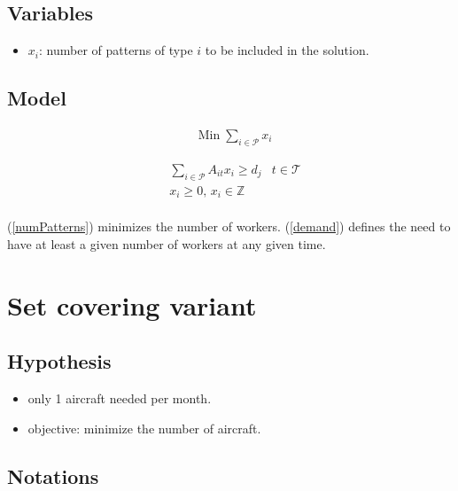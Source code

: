 \documentclass[a4paper,11pt]{article}
\begin{document}
    \subsection{Variables}

    \begin{itemize}
     \item $x_i$: number of patterns of type $i$ to be included in the solution.
    \end{itemize}

    \subsection{Model}

    \begin{align}
        & \text{Min}\; \sum_{i \in \mathcal{P}} x_i \label{numPatterns}
    \end{align}

    \begin{align}
        & \sum_{i \in \mathcal{P}} A_{it}x_{i} \geq d_j & t \in \mathcal{T} \label{demand} \\
        & x_{i} \geq 0,\, x_{i} \in \mathbb{Z} \\
    \end{align}

    (\ref{numPatterns}) minimizes the number of workers. (\ref{demand}) defines the need to have at least a given number of workers at any given time.  

\clearpage

\section{Set covering variant}

    \subsection{Hypothesis}

    \begin{itemize}
     \item only 1 aircraft needed per month.
     \item objective: minimize the number of aircraft.
    \end{itemize}

    \subsection{Notations}
\end{document}

